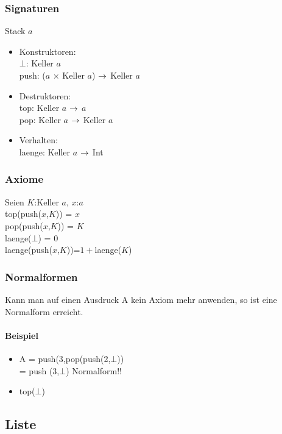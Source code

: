 \documentclass[a4paper]{scrartcl}
\begin{document}
\subsubsection*{Signaturen}
Stack $a$
\begin{itemize}
	\item Konstruktoren:\\
$\bot$: Keller $a$\\
push: ($a$ $\times$ Keller $a$) $\rightarrow$ Keller $a$\\
	\item Destruktoren:\\
top: Keller $a$ $\rightarrow$ $a$\\
pop: Keller $a$ $\rightarrow$ Keller $a$\\
	\item Verhalten:\\
laenge: Keller $a$ $\rightarrow$ Int\\
\end{itemize}
\subsubsection*{Axiome}
Seien $K$:Keller $a$, $x$:$a$\\
top(push($x$,$K$)) = $x$\\
pop(push($x$,$K$)) = $K$\\
laenge($\bot$)   = $0$\\
laenge(push($x$,$K$))=$1+$laenge($K$)\\

\subsubsection*{Normalformen}
Kann man auf einen Ausdruck A kein Axiom mehr anwenden, so ist eine Normalform erreicht.
	\paragraph{Beispiel}
	\begin{itemize}
		\item 
A = push(3,pop(push(2,$\bot$))\\
 = push (3,$\bot$) Normalform!!
		\item	top($\bot$)
	\end{itemize}
\subsection{Liste}
\end{document}
